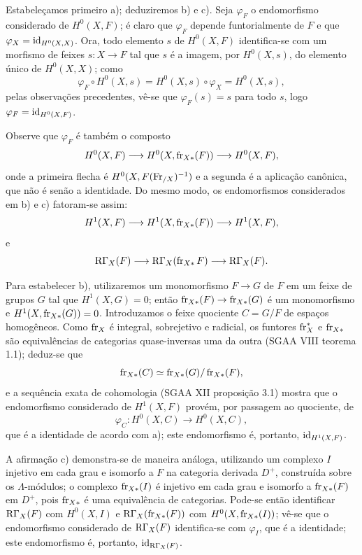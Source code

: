 Estabeleçamos primeiro a); deduziremos b) e c). Seja $\varphi_F$ o endomorfismo considerado de $H^0(X,F)$; é claro que $\varphi_F$ depende funtorialmente de $F$ e que $\varphi_X=\operatorname{id}_{H^0(X,X)}$. Ora, todo elemento $s$ de $H^0(X,F)$ identifica-se com um morfismo de feixes $s:X\to F$ tal que $s$ é a imagem, por $H^0(X,s)$, do elemento único de $H^0(X,X)$; como
\[
\varphi_F\circ H^0(X,s)=H^0(X,s)\circ\varphi_X=H^0(X,s),
\]
pelas observações precedentes, vê-se que $\varphi_F(s)=s$ para todo $s$, logo $\varphi_F=\operatorname{id}_{H^0(X,F)}$.

Observe que $\varphi_F$ é também o composto
\[
H^0(X,F)\longrightarrow H^0(X,\operatorname{fr}_{X*}(F))
\longrightarrow H^0(X,F),
\]
onde a primeira flecha é $H^0(X,F(\operatorname{Fr}_{/X})^{-1})$ e a segunda é a aplicação canônica, que não é senão a identidade. Do mesmo modo, os endomorfismos considerados em b) e c) fatoram-se assim:
\[
H^1(X,F)\longrightarrow H^1(X,\operatorname{fr}_{X*}(F))
\longrightarrow H^1(X,F),
\]
e
\[
\mathrm{R}\Gamma_X(F)\longrightarrow \mathrm{R}\Gamma_X(\operatorname{fr}_{X*}F)
\longrightarrow \mathrm{R}\Gamma_X(F).
\]

Para estabelecer b), utilizaremos um monomorfismo $F\to G$ de $F$ em um feixe de grupos $G$ tal que $H^1(X,G)=0$; então $\operatorname{fr}_{X*}(F)\to\operatorname{fr}_{X*}(G)$ é um monomorfismo e $H^1(X,\operatorname{fr}_{X*}(G))=0$. Introduzamos o feixe quociente $C=G/F$ de espaços homogêneos. Como $\operatorname{fr}_X$ é integral, sobrejetivo e radicial, os funtores $\operatorname{fr}_X^*$ e $\operatorname{fr}_{X*}$ são equivalências de categorias quase-inversas uma da outra (SGAA VIII teorema 1.1); deduz-se que
\[
\operatorname{fr}_{X*}(C)\simeq\operatorname{fr}_{X*}(G)/\operatorname{fr}_{X*}(F),
\]
e a sequência exata de cohomologia (SGAA XII proposição 3.1) mostra que o endomorfismo considerado de $H^1(X,F)$ provém, por passagem ao quociente, de
\[
\varphi_C:H^0(X,C)\longrightarrow H^0(X,C),
\]
que é a identidade de acordo com a); este endomorfismo é, portanto, $\operatorname{id}_{H^1(X,F)}$.

A afirmação c) demonstra-se de maneira análoga, utilizando um complexo $I$ injetivo em cada grau e isomorfo a $F$ na categoria derivada $D^+$, construída sobre os $\Lambda$-módulos; o complexo $\operatorname{fr}_{X*}(I)$ é injetivo em cada grau e isomorfo a $\operatorname{fr}_{X*}(F)$ em $D^+$, pois $\operatorname{fr}_{X*}$ é uma equivalência de categorias. Pode-se então identificar $\mathrm{R}\Gamma_X(F)$ com $H^0(X,I)$ e $\mathrm{R}\Gamma_X(\operatorname{fr}_{X*}(F))$ com $H^0(X,\operatorname{fr}_{X*}(I))$; vê-se que o endomorfismo considerado de $\mathrm{R}\Gamma_X(F)$ identifica-se com $\varphi_I$, que é a identidade; este endomorfismo é, portanto, $\operatorname{id}_{\mathrm{R}\Gamma_X(F)}$.
